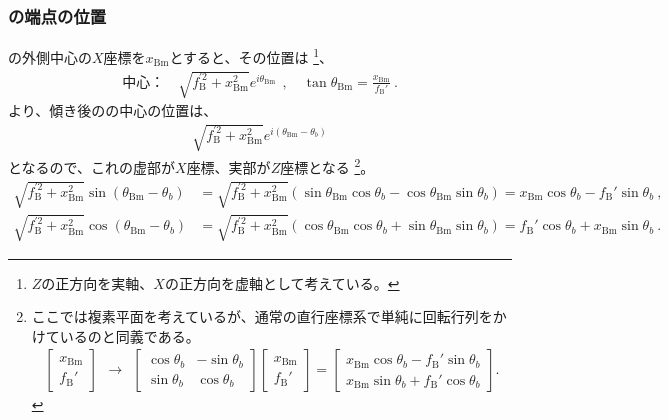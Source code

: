 \subsubsection{\BottomCurvedOutcut の端点の位置}
\BottomEndFace の外側中心の$X$座標を$x_\mathrm{Bm}$とすると、その位置は
\footnote{$Z$の正方向を実軸、$X$の正方向を虚軸として考えている。}、
\begin{align*}
  \text{中心：}\quad
  \sqrt{f_\mathrm B^{'2}+x_\mathrm{Bm}^2}e^{i\theta_\mathrm{Bm}}~~, \quad
  \tan\theta_\mathrm{Bm}= \frac{x_\mathrm{Bm}}{f_\mathrm B'}\ .
\end{align*}
より、傾き後の\nameBottomEndFace の中心の位置は、
\begin{align*}
  \sqrt{f_\mathrm B^{'2}+x_\mathrm{Bm}^2}e^{i(\theta_\mathrm{Bm}-\theta_b)}
\end{align*}
となるので、これの虚部が$X$座標、実部が$Z$座標となる
\footnote{ここでは複素平面を考えているが、通常の直行座標系で単純に回転行列をかけているのと同義である。
\begin{align*}
  \left[
    \begin{array}{c}
      x_\mathrm{Bm}\\
      f_\mathrm B'
    \end{array}
  \right]
  ~~\longrightarrow~~
  \left[
    \begin{array}{cc}
      \cos\theta_b & -\sin\theta_b\\
      \sin\theta_b & \cos\theta_b
    \end{array}
  \right]\!\!
  \left[
    \begin{array}{c}
      x_\mathrm{Bm}\\
      f_\mathrm B'
    \end{array}
  \right]
  = \left[
    \begin{array}{c}
      x_\mathrm{Bm}\cos\theta_b-f_\mathrm B'\sin\theta_b\\
      x_\mathrm{Bm}\sin\theta_b+f_\mathrm B'\cos\theta_b
    \end{array}
  \right].
\end{align*}%
}。
\begin{align*}
  \sqrt{f_\mathrm B^{'2}+x_\mathrm{Bm}^2}\sin(\theta_\mathrm{Bm}-\theta_b)
  &= \sqrt{f_\mathrm B^{'2}+x_\mathrm{Bm}^2}(\sin\theta_\mathrm{Bm}\cos\theta_b-\cos\theta_\mathrm{Bm}\sin\theta_b)
   = x_\mathrm{Bm}\cos\theta_b-f_\mathrm B'\sin\theta_b~,\\
  \sqrt{f_\mathrm B^{'2}+x_\mathrm{Bm}^2}\cos(\theta_\mathrm{Bm}-\theta_b)
  &= \sqrt{f_\mathrm B^{'2}+x_\mathrm{Bm}^2}(\cos\theta_\mathrm{Bm}\cos\theta_b+\sin\theta_\mathrm{Bm}\sin\theta_b)
   = f_\mathrm B'\cos\theta_b+x_\mathrm{Bm}\sin\theta_b~.
\end{align*}
